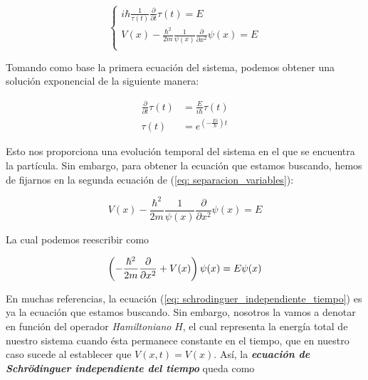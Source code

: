 \documentclass{article}
\numberwithin{equation}{section} %
\begin{document}
    \begin{equation}
        \begin{cases}
            \displaystyle i \hbar \frac{1}{\tau(t)} \frac{\partial}{\partial t} \tau(t) = E \\[10pt]
            \displaystyle V(x) - \frac{\hbar^{2}}{2m} \frac{1}{\psi(x)} \frac{\partial}{\partial x^{2}} \psi(x) = E \\[10pt]
        \end{cases}
        \label{eq: separacion_variables}
    \end{equation}

    Tomando como base la primera ecuación del sistema, podemos obtener una solución exponencial de la siguiente manera:
        
    \begin{align*}
        \frac{\partial}{\partial t} \tau(t) &= \frac{E}{i \hbar} \tau(t) \\[10pt]
        \tau(t) &= e ^ { \left( - \frac{Ei}{\hbar} \right) t}
    \end{align*}

    Esto nos proporciona una evolución temporal del sistema en el que se encuentra la partícula. Sin embargo, para obtener la ecuación que estamos buscando, hemos de fijarnos en la segunda ecuación de (\ref{eq: separacion_variables}):

    \begin{equation*}
        V(x) - \frac{\hbar^{2}}{2m} \frac{1}{\psi(x)} \frac{\partial}{\partial x^{2}} \psi(x) = E
    \end{equation*}

    La cual podemos reescribir como

    \begin{equation}
        \left( - \frac{\hbar^{2}}{2m} \frac{\partial}{\partial x^{2}} + V(x) \right) \psi(x) = E \psi(x) \\[5pt]
        \label{eq: schrodinguer_independiente_tiempo}
    \end{equation}

    En muchas referencias, la ecuación (\ref{eq: schrodinguer_independiente_tiempo}) es ya la ecuación que estamos buscando. Sin embargo, nosotros la vamos a denotar en función del operador \textit{Hamiltoniano} \( H \), el cual representa la energía total de nuestro sistema cuando ésta permanece constante en el tiempo, que en nuestro caso sucede al establecer que \( V(x, t) = V(x) \). Así, la \textbf{\textit{ecuación de Schrödinguer independiente del tiempo}} queda como
    
\end{document}
